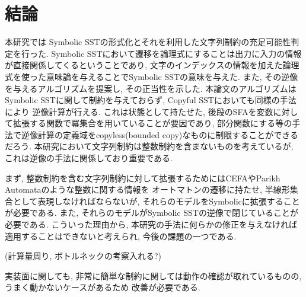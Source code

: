 \documentclass[uplatex,dvipdfmx,a4j]{jsreport}
\begin{document}
  \chapter{結論}  \label{chap:conclusion}

  本研究では Symbolic SSTの形式化とそれを利用した文字列制約の充足可能性判定を行った.
  Symbolic SSTにおいて遷移を論理式にすることは出力に入力の情報が直接関係してくるということであり,
  文字のインデックスの情報を加えた論理式を使った意味論を与えることでSymbolic SSTの意味を与えた.
  また, その逆像を与えるアルゴリズムを提案し, その正当性を示した.
  本論文のアルゴリズムはSymbolic SSTに関して制約を与えておらず, Copyful SSTにおいても同様の手法により
  逆像計算が行える.
  これは状態として持たせた, 後段のSFAを変数に対して拡張する関数で冪集合を用いていることが要因であり,
  部分関数にする等の手法で逆像計算の定義域をcopyless(bounded copy)なものに制限することができるだろう.
  本研究において文字列制約は整数制約を含まないものを考えているが, これは逆像の手法に関係しており重要である.

  まず, 整数制約を含む文字列制約に対して拡張するためにはCEFAやParikh Automataのような整数に関する情報を
  オートマトンの遷移に持たせ, 半線形集合として表現しなければならないが,
  それらのモデルをSymbolicに拡張することが必要である.
  また, それらのモデルがSymbolic SSTの逆像で閉じていることが必要である.
  こういった理由から, 本研究の手法に何らかの修正を与えなければ適用することはできないと考えられ, 今後の課題の一つである.

  (計算量周り, ボトルネックの考察入れる?)

  実装面に関しても, 非常に簡単な制約に関しては動作の確認が取れているものの, うまく動かないケースがあるため
  改善が必要である.
\end{document}
